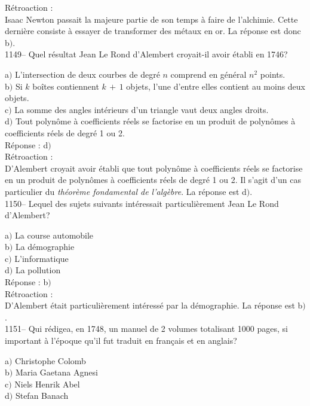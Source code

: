 ﻿\documentclass[letterpaper, 12pt]{article}
\begin{document}
R\'etroaction : \\
Isaac Newton passait la majeure partie de son temps \`a faire de l'alchimie.
Cette derni\`ere consiste \`a essayer de transformer des m\'etaux en or. La
r\'eponse est donc b$)$.\\

1149-- Quel r\'esultat Jean Le Rond d'Alembert croyait-il avoir
\'etabli en 1746?

a$)$ L'intersection de deux courbes de degr\'e $n$ comprend en g\'en\'eral
$n^2$ points. \\
b$)$ Si $k$ bo\^ites contiennent $k\,+\,1$ objets, l'une d'entre elles
contient au moins deux objets. \\
c$)$ La somme des angles int\'erieurs d'un triangle vaut deux angles droits.
\\
d$)$ Tout polyn\^ome \`a coefficients r\'eels se factorise en un produit de
polyn\^omes \`a coefficients r\'eels de degr\'e 1 ou 2.\\

R\'eponse : d$)$\\

R\'etroaction : \\
D'Alembert croyait avoir \'etabli que tout polyn\^ome \`a
coefficients r\'eels se factorise en un produit de polyn\^omes \`a
coefficients r\'eels de degr\'e 1 ou 2. Il s'agit d'un cas
particulier du {\sl th\'eor\`eme fondamental de l'alg\`ebre}.
La r\'eponse est d$)$.\\

1150-- Lequel des sujets suivants int\'eressait particuli\`erement
Jean Le Rond d'Alembert?

a$)$ La course automobile \\
b$)$ La d\'emographie \\
c$)$ L'informatique  \\
d$)$ La pollution \\

R\'eponse : b$)$\\

R\'etroaction : \\
D'Alembert \'etait particuli\`erement int\'eress\'e par la d\'emographie. La
r\'eponse est b$)$.\\

1151-- Qui r\'edigea, en 1748, un manuel de 2 volumes totalisant
1000 pages, si important \`a l'\'epoque qu'il fut traduit en fran\c
cais et en anglais?

a$)$ Christophe Colomb \\
b$)$ Maria Gaetana Agnesi \\
c$)$ Niels Henrik Abel \\
d$)$ Stefan Banach  \\
\end{document}
